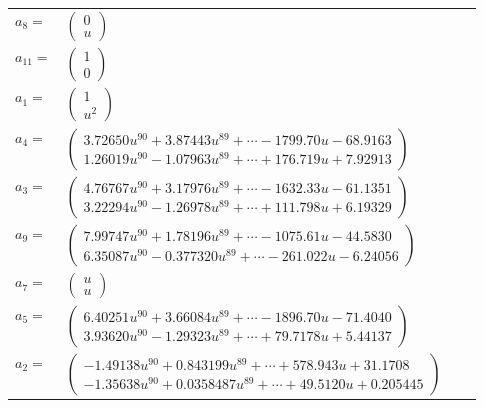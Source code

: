 \documentclass[1p]{elsarticle_modified}
\theoremstyle{definition}
\begin{document}
\begin{tabular}{m{7pt} m{180pt} m{7pt} m{180pt} }
\flushright $a_{8}=$&$\begin{pmatrix}0\\u\end{pmatrix}$ \\
\flushright $a_{11}=$&$\begin{pmatrix}1\\0\end{pmatrix}$ \\
\flushright $a_{1}=$&$\begin{pmatrix}1\\u^2\end{pmatrix}$ \\
\flushright $a_{4}=$&$\begin{pmatrix}3.72650 u^{90}+3.87443 u^{89}+\cdots-1799.70 u-68.9163\\1.26019 u^{90}-1.07963 u^{89}+\cdots+176.719 u+7.92913\end{pmatrix}$ \\
\flushright $a_{3}=$&$\begin{pmatrix}4.76767 u^{90}+3.17976 u^{89}+\cdots-1632.33 u-61.1351\\3.22294 u^{90}-1.26978 u^{89}+\cdots+111.798 u+6.19329\end{pmatrix}$ \\
\flushright $a_{9}=$&$\begin{pmatrix}7.99747 u^{90}+1.78196 u^{89}+\cdots-1075.61 u-44.5830\\6.35087 u^{90}-0.377320 u^{89}+\cdots-261.022 u-6.24056\end{pmatrix}$ \\
\flushright $a_{7}=$&$\begin{pmatrix}u\\u\end{pmatrix}$ \\
\flushright $a_{5}=$&$\begin{pmatrix}6.40251 u^{90}+3.66084 u^{89}+\cdots-1896.70 u-71.4040\\3.93620 u^{90}-1.29323 u^{89}+\cdots+79.7178 u+5.44137\end{pmatrix}$ \\
\flushright $a_{2}=$&$\begin{pmatrix}-1.49138 u^{90}+0.843199 u^{89}+\cdots+578.943 u+31.1708\\-1.35638 u^{90}+0.0358487 u^{89}+\cdots+49.5120 u+0.205445\end{pmatrix}$ \\

\end{tabular}
\end{document}
